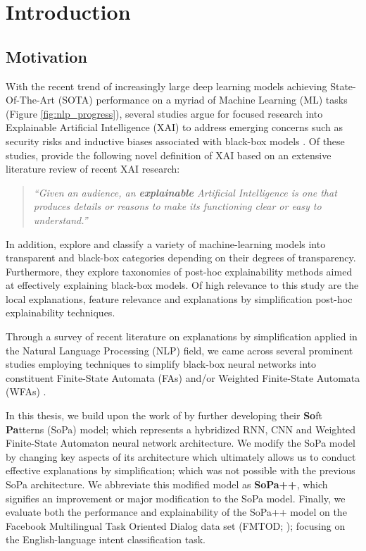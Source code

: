 \chapter{Introduction}

\label{chapter:introduction}

\section{Motivation}

With the recent trend of increasingly large deep learning models achieving
State-Of-The-Art (SOTA) performance on a myriad of Machine Learning (ML) tasks
(Figure \ref{fig:nlp_progress}), several studies argue for focused research into
Explainable Artificial Intelligence (XAI) to address emerging concerns such as
security risks and inductive biases associated with black-box models
\citep{doran2017does,townsend2019extracting,danilevsky2020survey,arrieta2020explainable}.
Of these studies, \citet[Page 4, Section 2.2]{arrieta2020explainable} provide
the following novel definition of XAI based on an extensive literature review of
recent XAI research:

\begin{quote}
  \textit{``Given an audience, an \textbf{explainable} Artificial Intelligence
    is one that produces details or reasons to make its functioning clear or
    easy to understand.''}
\end{quote}

In addition, \citet{arrieta2020explainable} explore and classify a variety of
machine-learning models into transparent and black-box categories depending on
their degrees of transparency. Furthermore, they explore taxonomies of post-hoc
explainability methods aimed at effectively explaining black-box models. Of high
relevance to this study are the local explanations, feature relevance and
explanations by simplification post-hoc explainability techniques.

Through a survey of recent literature on explanations by simplification applied
in the Natural Language Processing (NLP) field, we came across several prominent
studies employing techniques to simplify black-box neural networks into
constituent Finite-State Automata (FAs) and/or Weighted Finite-State Automata
(WFAs)
\citep{schwartz2018sopa,peng2018rational,suresh-etal-2019-distilling,wang2019state,jiang2020cold}.

In this thesis, we build upon the work of \citet{schwartz2018sopa} by further
developing their \textbf{So}ft \textbf{Pa}tterns (SoPa) model; which represents
a hybridized RNN, CNN and Weighted Finite-State Automaton neural network
architecture. We modify the SoPa model by changing key aspects of its
architecture which ultimately allows us to conduct effective explanations by
simplification; which was not possible with the previous SoPa architecture. We
abbreviate this modified model as \textbf{SoPa++}, which signifies an
improvement or major modification to the SoPa model. Finally, we evaluate both
the performance and explainability of the SoPa++ model on the Facebook
Multilingual Task Oriented Dialog data set (FMTOD;
\citealt{schuster-etal-2019-cross-lingual}); focusing on the English-language
intent classification task.

